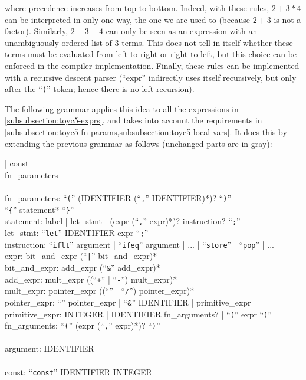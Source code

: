 \noindent where precedence increases from top to bottom. Indeed, with these
rules, $2+3*4$ can be interpreted in only one way, the one we are used to
(because $2+3$ is not a factor). Similarly, $2-3-4$ can only be seen as an
expression with an unambiguously ordered list of 3 terms. This does not tell in
itself whether these terms must be evaluated from left to right or right to
left, but this choice can be enforced in the compiler implementation. Finally,
these rules can be implemented with a recursive descent parser (``expr''
indirectly uses itself recursively, but only after the ``{\tt (}'' token; hence
there is no left recursion).

The following grammar applies this idea to all the expressions in
\cref{subsubsection:toyc5-exprs}, and takes into account the requirements in
\cref{subsubsection:toyc5-fn-params,subsubsection:toyc5-local-vars}. It does
this by extending the previous grammar as follows (unchanged parts are in gray):

\begin{Paragraph}
 | const\\
 fn\_parameters \\
\\
fn\_parameters: ``{\tt (}'' (IDENTIFIER (``{\tt ,}'' IDENTIFIER)*)?
  ``{\tt )}''\\
 ``{\tt \{}'' statement* ``{\tt \}}''
  \\
statement: label | let\_stmt | (expr (``{\tt ,}'' expr)*)? instruction?
  ``{\tt ;}''\\
let\_stmt: ``{\tt let}'' IDENTIFIER expr ``{\tt ;}''\\
instruction: ``{\tt iflt}'' argument | ``{\tt ifeq}'' argument | ... |
  ``{\tt store}'' | ``{\tt pop}'' | ...\\
expr: bit\_and\_expr (``{\tt |}'' bit\_and\_expr)*\\
bit\_and\_expr: add\_expr (``{\tt \&}'' add\_expr)*\\
add\_expr: mult\_expr ((``{\tt +}'' | ``{\tt -}'') mult\_expr)*\\
mult\_expr: pointer\_expr ((``{\tt *}'' | ``{\tt /}'') pointer\_expr)*\\
pointer\_expr: ``{\tt *}'' pointer\_expr | ``{\tt \&}'' IDENTIFIER |
primitive\_expr\\
primitive\_expr:  INTEGER | IDENTIFIER fn\_arguments? |
  ``{\tt (}'' expr ``{\tt )}''\\
fn\_arguments: ``{\tt (}'' (expr (``{\tt ,}'' expr)*)? ``{\tt )}''\\
\\
argument: IDENTIFIER\\
\\
const: ``{\tt const}'' IDENTIFIER INTEGER
\end{Paragraph}

